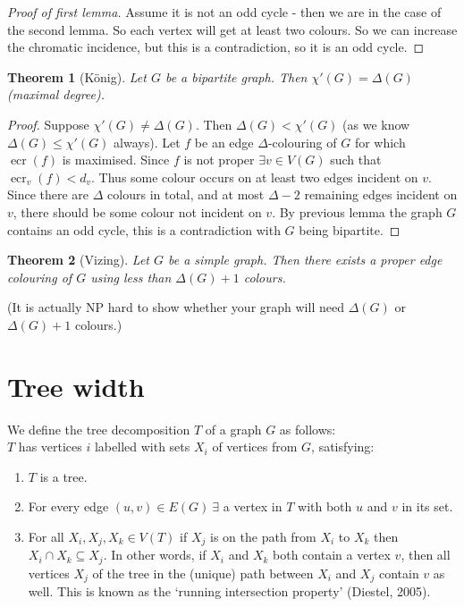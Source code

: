\documentclass{article}
\newtheorem*{thm}{Theorem}
\theoremstyle{definition}
\DeclareMathOperator{\ecr}{ecr}
\begin{document}
\begin{proof}[Proof of first lemma]
Assume it is not an odd cycle - then we are in the case of the second lemma.
So each vertex will get at least two colours.
So we can increase the chromatic incidence, but this is a contradiction, so it is an odd cycle.
\end{proof}

\begin{thm}[K\"onig]
Let $G$ be a bipartite graph.
Then $\chi'(G) = \Delta(G)$ (maximal degree).
\end{thm}

\begin{proof}
Suppose $\chi'(G) \ne \Delta(G)$.
Then $\Delta(G) < \chi'(G)$ (as we know $\Delta(G) \le \chi'(G)$ always).
Let $f$ be an edge $\Delta$-colouring of $G$ for which $\ecr(f)$ is maximised.
Since $f$ is not proper $\exists v\in V(G)$ such that $\ecr_v(f) < d_v$.
Thus some colour occurs on at least two edges incident on $v$.
Since there are $\Delta$ colours in total, and at most $\Delta-2$ remaining edges incident on $v$, there should be some colour not incident on $v$.
By previous lemma the graph $G$ contains an odd cycle, this is a contradiction with $G$ being bipartite.
\end{proof}

\begin{thm}[Vizing]
Let $G$ be a simple graph.
Then there exists a proper edge colouring of $G$ using less than $\Delta(G) + 1$ colours.
\end{thm}

(It is actually NP hard to show whether your graph will need $\Delta(G)$ or $\Delta(G) + 1$ colours.)



\section{Tree width}

We define the tree decomposition $T$ of a graph $G$ as follows: \\
$T$ has vertices $i$ labelled with sets $X_i$ of vertices from $G$, satisfying:
\begin{enumerate}
\item $T$ is a tree.
\item For every edge $(u,v)\in E(G)\ \exists$ a vertex in $T$ with both $u$ and $v$ in its set.
\item For all $X_i,X_j,X_k\in V(T)$ if $X_j$ is on the path from $X_i$ to $X_k$ then $X_i\cap X_k\subseteq X_j$. In other words, if $X_i$ and $X_k$ both contain a vertex $v$, then all vertices $X_j$ of the tree in the (unique) path between $X_i$ and $X_j$ contain $v$ as well. This is known as the `running intersection property' (Diestel, 2005).
\end{enumerate}
\end{document}
